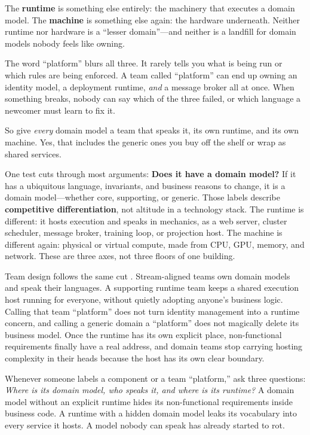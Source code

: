 \documentclass[10pt,a4paper]{article}
\begin{document}
The \textbf{runtime} is something else entirely: the machinery that executes a domain model. The \textbf{machine} is something else again: the hardware underneath. Neither runtime nor hardware is a “lesser domain”—and neither is a landfill for domain models nobody feels like owning.

The word “platform” blurs all three. It rarely tells you what is being run or which rules are being enforced. A team called “platform” can end up owning an identity model, a deployment runtime, \emph{and} a message broker all at once. When something breaks, nobody can say which of the three failed, or which language a newcomer must learn to fix it.

So give \emph{every} domain model a team that speaks it, its own runtime, and its own machine. Yes, that includes the generic ones you buy off the shelf or wrap as shared services.

One test cuts through most arguments: \textbf{Does it have a domain model?} If it has a ubiquitous language, invariants, and business reasons to change, it is a domain model—whether core, supporting, or generic. Those labels describe \textbf{competitive differentiation}, not altitude in a technology stack. The runtime is different: it hosts execution and speaks in mechanics, as a web server, cluster scheduler, message broker, training loop, or projection host. The machine is different again: physical or virtual compute, made from CPU, GPU, memory, and network. These are three axes, not three floors of one building.

Team design follows the same cut \cite{skelton19}. Stream-aligned teams own domain models and speak their languages. A supporting runtime team keeps a shared execution host running for everyone, without quietly adopting anyone's business logic. Calling that team “platform” does not turn identity management into a runtime concern, and calling a generic domain a “platform” does not magically delete its business model. Once the runtime has its own explicit place, non-functional requirements finally have a real address, and domain teams stop carrying hosting complexity in their heads because the host has its own clear boundary.

\begin{devnote}
Whenever someone labels a component or a team “platform,” ask three questions: \emph{Where is its domain model, who speaks it, and where is its runtime?} A domain model without an explicit runtime hides its non-functional requirements inside business code. A runtime with a hidden domain model leaks its vocabulary into every service it hosts. A model nobody can speak has already started to rot.
\end{devnote}
\end{document}
